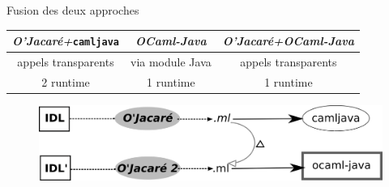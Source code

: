 \documentclass[xcolor={table,dvipsnames}]{beamer}
\newcommand{\camljava}{{\tt{camljava}}}
\begin{document}
\begin{frame}{Fusion des deux approches}

\begin{tabular}{|c|c@{\,\vrule width 6pt\,}c|}
  \hline
   \cellcolor[gray]{0.6}\emph{O'Jacaré+}\camljava & \cellcolor[gray]{0.6}\emph{OCaml-Java}& \cellcolor[gray]{0.6} \emph{O'Jacaré+OCaml-Java}\\
  \hline\hline
 \cellcolor[gray]{0.8} appels transparents & via module Java & \cellcolor[gray]{0.8}appels transparents\\
\hline
  2 runtime &\cellcolor[gray]{0.8} 1 runtime&\cellcolor[gray]{0.8} 1 runtime \\
\hline
\end{tabular}

\bigskip 

\begin{figure}[h]
  \centering
  \includegraphics[scale=1]{schema1.png}
\end{figure}

\end{frame}
\end{document}
